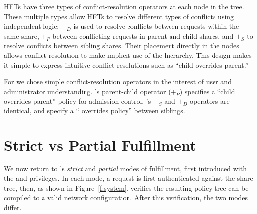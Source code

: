 HFTs have three types of conflict-resolution operators at each node in the tree. 
These multiple types allow HFTs to resolve different types of conflicts using
independent logic: $+_D$ is used to resolve conflicts between requests
within the same share, $+_P$ between conflicting requests in parent and
child shares, and $+_S$ to resolve conflicts between sibling shares.
Their placement directly in the nodes allows conflict resolution to make implicit use of
the hierarchy.
This design makes it simple to express intuitive conflict resolutions such as
``child overrides parent.''

For \sys we chose simple conflict-resolution operators in the
interest of user and administrator understanding.
\sys's parent-child operator ($+_P$) specifies a ``child
overrides parent'' policy for admission control. \sys's $+_S$ and $+_D$
operators are identical, and specify a `` overrides
 policy'' between siblings.



\section{Strict vs Partial Fulfillment}
\label{sec:strict-partial}

We now return to \sys's \emph{strict} and \emph{partial} modes of
fulfillment, first introduced with the  and 
privileges. In each mode, a request is first authenticated against the
share tree, then, as shown in Figure~\ref{f:system}, \sys verifies the resulting policy tree can be
compiled to a valid network configuration.
After this verification, the two modes differ.

